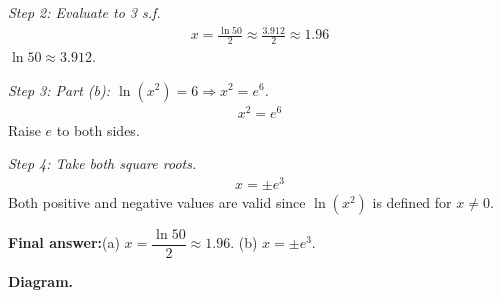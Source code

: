 \documentclass[11pt]{article}
\begin{document}
\textit{Step 2: Evaluate to 3 s.f.}
\[\begin{gathered}
x = \frac{\ln 50}{2} \approx \frac{3.912}{2} \approx 1.96
\end{gathered}\]
\( \ln 50 \approx 3.912 \).

\textit{Step 3: Part (b): \( \ln(x^2) = 6 \Rightarrow x^2 = e^6 \).}
\[\begin{gathered}
x^2 = e^6
\end{gathered}\]
Raise \( e \) to both sides.

\textit{Step 4: Take both square roots.}
\[\begin{gathered}
x = \pm e^3
\end{gathered}\]
Both positive and negative values are valid since \( \ln(x^2) \) is defined for \( x \neq 0 \).

\begin{answerbox}
\textbf{Final answer:}\quad (a) \(\displaystyle  x = \dfrac{\ln 50}{2} \approx 1.96 \). (b) \(\displaystyle  x = \pm e^3 \).
\end{answerbox}
\textbf{Diagram.}
\end{document}
